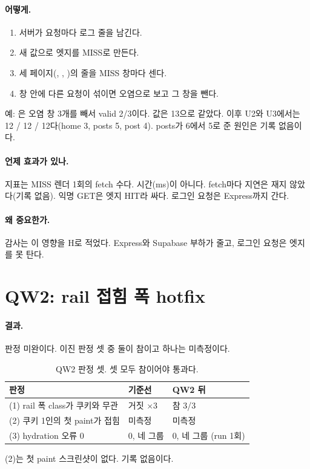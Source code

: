 \paragraph{어떻게.}
\begin{enumerate}[nosep]
  \item 서버가 요청마다  로그 줄을 남긴다.
  \item {} 새 값으로 엣지를 MISS로 만든다.
  \item 세 페이지(\code{/}, , )의 줄을 MISS 창마다 센다.
  \item 창 안에 다른 요청이 섞이면 오염으로 보고 그 창을 뺀다.
\end{enumerate}
예: 은 오염 창 3개를 빼서 valid 2/3이다. 값은 13으로 같았다.
이후 U2와 U3에서는 12 / 12 / 12다(home 3, posts 5, post 4). posts가 6에서 5로 준 원인은 기록 없음이다.

\paragraph{언제 효과가 있나.}
지표는 MISS 렌더 1회의 fetch 수다. 시간(ms)이 아니다.
fetch마다 지연은 재지 않았다(기록 없음).
익명 GET은 엣지 HIT라 싸다. 로그인 요청은 Express까지 간다.

\paragraph{왜 중요한가.}
감사는 이 영향을 H로 적었다. Express와 Supabase 부하가 줄고, 로그인 요청은 엣지를 못 탄다.

\section{QW2: rail 접힘 폭 hotfix}\label{sec:re-qw2}

\paragraph{결과.}
판정 미완이다. 이진 판정 셋 중 둘이 참이고 하나는 미측정이다.
\begin{table}[H]
  \caption{QW2 판정 셋. 셋 모두 참이어야 통과다.}
  \label{tab:re-qw2}
  \centering\small
  \begin{tabularx}{\linewidth}{@{}Y L{2.4cm} L{2.4cm}@{}}
    \toprule
    판정 & 기준선 & QW2 뒤 \\
    \midrule
    (1) rail 폭 class가 쿠키와 무관 & 거짓 $\times$3 & 참 3/3 \\
    \midrule
    (2) 쿠키 1인의 첫 paint가 접힘 & 미측정 & 미측정 \\
    \midrule
    (3) hydration 오류 0 & 0, 네 그룹 & 0, 네 그룹 (run 1회) \\
    \bottomrule
  \end{tabularx}
\end{table}
(2)는 첫 paint 스크린샷이 없다. 기록 없음이다.

